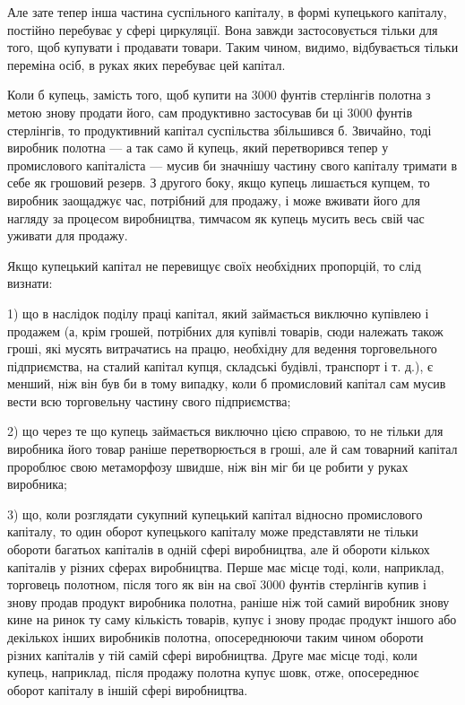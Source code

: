 Але зате тепер інша частина суспільного капіталу, в формі
купецького капіталу, постійно перебуває у сфері циркуляції.
Вона завжди застосовується тільки для того, щоб купувати
і продавати товари. Таким чином, видимо, відбувається тільки
переміна осіб, в руках яких перебуває цей капітал.

Коли б купець, замість того, щоб купити на 3000 фунтів
стерлінгів полотна з метою знову продати його, сам продуктивно
застосував би ці 3000 фунтів стерлінгів, то продуктивний капітал
суспільства збільшився б. Звичайно, тоді виробник полотна —
а так само й купець, який перетворився тепер у промислового
капіталіста — мусив би значнішу частину свого капіталу тримати
в себе як грошовий резерв. З другого боку, якщо купець
лишається купцем, то виробник заощаджує час, потрібний
для продажу, і може вживати його для нагляду за процесом
виробництва, тимчасом як купець мусить весь свій час уживати
для продажу.

Якщо купецький капітал не перевищує своїх необхідних пропорцій,
то слід визнати:

1) що в наслідок поділу праці капітал, який займається виключно
купівлею і продажем (а, крім грошей, потрібних для
купівлі товарів, сюди належать також гроші, які мусять витрачатись
на працю, необхідну для ведення торговельного підприємства,
на сталий капітал купця, складські будівлі, транспорт
і т. д.), є менший, ніж він був би в тому випадку, коли б промисловий
капітал сам мусив вести всю торговельну частину
свого підприємства;

2) що через те що купець займається виключно цією справою,
то не тільки для виробника його товар раніше перетворюється
в гроші, але й сам товарний капітал пророблює свою
метаморфозу швидше, ніж він міг би це робити у руках виробника;

3) що, коли розглядати сукупний купецький капітал відносно
промислового капіталу, то один оборот купецького капіталу
може представляти не тільки обороти багатьох капіталів в одній
сфері виробництва, але й обороти кількох капіталів у різних
сферах виробництва. Перше має місце тоді, коли, наприклад,
торговець полотном, після того як він на свої 3000 фунтів
стерлінгів купив і знову продав продукт виробника полотна,
раніше ніж той самий виробник знову кине на ринок ту саму
кількість товарів, купує і знову продає продукт іншого або декількох
інших виробників полотна, опосереднюючи таким чином
обороти різних капіталів у тій самій сфері виробництва. Друге
має місце тоді, коли купець, наприклад, після продажу полотна
купує шовк, отже, опосереднює оборот капіталу в іншій сфері
виробництва.

